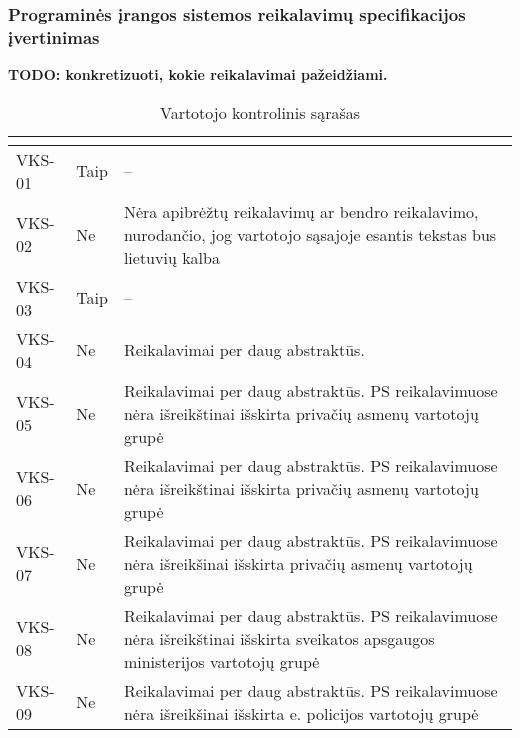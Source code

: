 \documentclass{VUMIFPSkursinis}
\begin{document}
\subsubsection{Programinės įrangos sistemos reikalavimų specifikacijos įvertinimas}
			\textbf{TODO: konkretizuoti, kokie reikalavimai pažeidžiami.}
			\begin{center}

\begin{longtable}{|C{2cm}|L{2.5cm}|L{10cm}|}

					\caption{Vartotojo kontrolinis sąrašas}
					\label{table:VKS}

 					\\ \hline
 					 &
  					 & 
 					\\ \hline
 					VKS-01 &
 					Taip& 
 					--\\ \hline
 					VKS-02 &
 					Ne&
 					Nėra apibrėžtų reikalavimų ar bendro reikalavimo, nurodančio, jog vartotojo sąsajoje esantis tekstas bus lietuvių kalba\\ \hline
 					VKS-03 &
 					Taip & 
					--\\ \hline  
 					VKS-04 &
 					Ne& 
 					Reikalavimai per daug abstraktūs.\\ \hline    
 					VKS-05 &
 					Ne& 
 					Reikalavimai per daug abstraktūs. PS reikalavimuose nėra išreikštinai išskirta privačių asmenų vartotojų grupė\\ \hline  
 					VKS-06 &
 					Ne&
 					Reikalavimai per daug abstraktūs. PS reikalavimuose nėra išreikštinai išskirta privačių asmenų vartotojų grupė\\ \hline   					
 					VKS-07 &
 					Ne&
 					Reikalavimai per daug abstraktūs. PS reikalavimuose nėra išreikšinai išskirta privačių asmenų vartotojų grupė\\ \hline  
 					VKS-08 &
 					Ne&
 					Reikalavimai per daug abstraktūs. PS reikalavimuose nėra išreikštinai išskirta sveikatos apsgaugos ministerijos vartotojų grupė\\ \hline  
 					VKS-09 &
 					Ne&
 					Reikalavimai per daug abstraktūs. PS reikalavimuose nėra išreikšinai išskirta e. policijos vartotojų grupė\\ \hline			
				\end{longtable}
			\end{center}		
			
\end{document}
